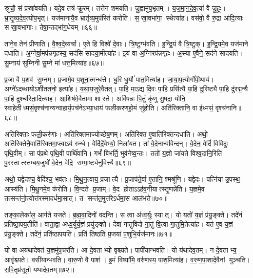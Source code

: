 स्रुचौ॒ सं प्रस्रा॑वयति।
यदे॒व तत्र॑ क्रू॒रम्।
तत्तेन॑ शमयति।
जु॒ह्वामु॑प॒भृतम्।
य॒ज॒मा॒न॒दे॒व॒त्या॑ वै जु॒हूः।
भ्रा॒तृ॒व्य॒दे॒व॒त्यो॑प॒भृत्।
यज॑मानायै॒व भ्रातृ॑व्य॒मुप॑स्तिं करोति।
स॒स्रा॒वभा॑गा॒ स्थेत्या॑ह।
वस॑वो॒ वै रु॒द्रा आ॑दि॒त्याः सस्रा॒वभा॑गाः।
तेषा॒न्तद्भा॑ग॒धेयम्॥६६॥

ताने॒व तेन॑ प्रीणाति।
वै॒श्व॒दे॒व्यर्चा।
ए॒ते हि विश्वे॑ दे॒वाः।
त्रि॒ष्टुग्भ॑वति।
इ॒न्द्रि॒यं वै त्रि॒ष्टुक्।
इ॒न्द्रि॒यमे॒व यज॑माने दधाति।
अ॒ग्नेर्वा॒मप॑न्नगृहस्य॒ सद॑सि सादया॒मीत्या॑ह।
इ॒यं वा अ॒ग्निरप॑न्नगृहः।
अ॒स्या ए॒वैने॒ सद॑ने सादयति।
सु॒म्नाय॑ सुम्निनी सु॒म्ने मा॑ धत्त॒मित्या॑ह॥६७॥

प्र॒जा वै प॒शव॑ सु॒म्नम्।
प्र॒जामे॒व प॒शूना॒त्मन्ध॑त्ते।
धु॒रि धु॒र्यौ॑ पात॒मित्या॑ह।
जा॒या॒प॒त्योर्गो॑पी॒थाय॑।
अग्ने॑ऽदब्धायोऽशीततनो॒ इत्या॑ह।
य॒था॒य॒जुरे॒वैतत्।
पा॒हि मा॒ऽद्य दि॒वः पा॒हि प्रसि॑त्यै पा॒हि दुरि॑ष्ट्यै पा॒हि दु॑रद्म॒न्यै पा॒हि दुश्च॑रिता॒दित्या॑ह।
आ॒शिष॑मे॒वैतामा शास्ते।
अवि॑षन्नः पि॒तुं कृ॑णु सु॒षदा॒ योनि॒ स्वाहेतीध्मसं॒वृश्च॑नान्यन्वाहार्य॒पच॑नेऽभ्या॒धाय॑ फलीकरणहो॒मं जु॑होति।
अति॑रिक्तानि॒ वा इ॑ध्मसं॒ वृश्च॑नानि॥६८॥

अति॑रिक्ताः फली॒कर॑णाः।
अति॑रिक्तमाज्योच्छेष॒णम्।
अति॑रिक्त ए॒वाति॑रिक्तन्दधाति।
अथो॒ अति॑रिक्तेनै॒वाति॑रिक्तमा॒प्त्वाऽव॑ रुन्धे।
वेदि॑र्दे॒वेभ्यो॒ निला॑यत।
तां वे॒देनान्व॑विन्दन्।
वे॒देन॒ वेदिं॑ विविदुः पृथि॒वीम्।
सा प॑प्रथे पृथि॒वी पार्थि॑वानि।
गर्भं॑ बिभर्ति॒ भुव॑नेष्व॒न्तः।
ततो॑ य॒ज्ञो जा॑यते विश्व॒दानि॒रिति॑ पु॒रस्तात्स्तम्बय॒जुषो॑ वे॒देन॒ वेदि॒ सम्मा॒र्ष्ट्यनु॑वित्त्यै॥६९॥

अथो॒ यद्वे॒दश्च॒ वेदि॑श्च॒ भव॑तः।
मि॒थु॒न॒त्वाय॒ प्रजात्यै।
प्र॒जाप॑ते॒र्वा ए॒तानि॒ श्मश्रू॑णि।
यद्वे॒दः।
पत्नि॑या उ॒पस्थ॒ आस्य॑ति।
मि॒थु॒नमे॒व क॑रोति।
वि॒न्दते प्र॒जाम्।
वे॒द होताऽऽह॑व॒नीयात्स्तृ॒णन्ने॑ति।
य॒ज्ञमे॒व तत्सन्त॑नो॒त्योत्त॑रस्मादर्धमा॒सात्।
त सन्त॑त॒मुत्त॑रेऽर्धमा॒स आल॑भते॥७०॥

तङ्का॒लेका॑ल॒ आग॑ते यजते।
ब्र॒ह्म॒वा॒दिनो॑ वदन्ति।
स त्वा अ॑ध्व॒र्युः स्यात्।
यो यतो॑ य॒ज्ञं प्र॑यु॒ङ्क्ते।
तदे॑नं प्रतिष्ठा॒पय॒तीति॑।
वाता॒द्वा अ॑ध्व॒र्युर्य॒ज्ञं प्रयु॑ङ्क्ते।
देवा॑ गातुविदो गा॒तुं वि॒त्वा गा॒तुमि॒तेत्या॑ह।
यत॑ ए॒व य॒ज्ञं प्र॑यु॒ङ्क्ते।
तदे॑नं॒ प्रति॑ष्ठापयति।
प्रति॑ तिष्ठति प्र॒जया॑ प॒शुभि॒र्यज॑मानः॥७१॥

यो वा अय॑थादेवतं य॒ज्ञमु॑प॒चर॑ति।
आ दे॒वताभ्यो वृश्च्यते।
पापी॑यान्भवति।
यो य॑थादेव॒तम्।
न दे॒वताभ्य॒ आवृ॑श्च्यते।
वसी॑यान्भवति।
वा॒रु॒णो वै पाश॑।
इ॒मं विष्या॑मि॒ वरु॑णस्य॒ पाश॒मित्या॑ह।
व॒रु॒ण॒पा॒शादे॒वैनां मुञ्चति।
स॒वि॒तृप्र॑सूतो यथादेव॒तम्॥७२॥

